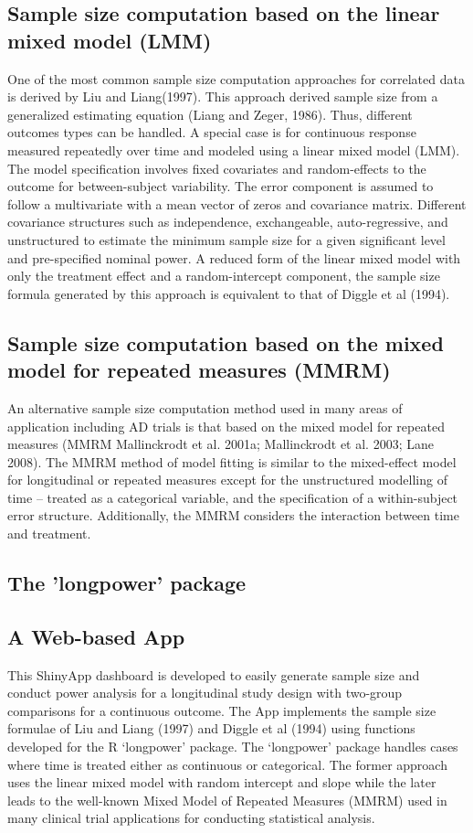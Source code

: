 \documentclass[oupdraft]{bio}
\begin{document}
\subsection{Sample size computation based on the linear mixed model (LMM)}
\label{model}
One of the most common sample size computation approaches for correlated data is derived by Liu and Liang(1997). This approach derived sample size from a generalized estimating equation (Liang and Zeger, 1986). Thus, different outcomes types can be handled. A special case is for continuous response measured repeatedly over time and modeled using a linear mixed model (LMM). The model specification involves fixed covariates and random-effects to the outcome for between-subject variability. The error component is assumed to follow a multivariate with a mean vector of zeros and covariance matrix. Different covariance structures such as independence, exchangeable, auto-regressive, and unstructured to estimate the minimum sample size for a given significant level and pre-specified nominal power. A reduced form of the linear mixed model with only the treatment effect and a random-intercept component, the sample size formula generated by this approach is equivalent to that of Diggle et al (1994). 

\subsection{Sample size computation based on the mixed model for repeated measures (MMRM)}
\label{model2}
An alternative sample size computation method used in many areas of application including AD trials is that based on the mixed model for repeated measures (MMRM Mallinckrodt et al. 2001a; Mallinckrodt et al. 2003; Lane 2008). The MMRM method of model fitting is similar to the mixed-effect model for longitudinal or repeated measures except for the unstructured modelling of time – treated as a categorical variable, and the specification of a within-subject error structure. Additionally, the MMRM considers the interaction between time and treatment. 

\subsection{The 'longpower' package}
\label{model3}

\subsection{A Web-based App}
\label{model4}
This ShinyApp dashboard is developed to easily generate sample size and conduct power analysis for a longitudinal study design with two-group comparisons for a continuous outcome. The App implements the sample size formulae of Liu and Liang (1997) and Diggle et al (1994) using functions developed for the R `longpower' package. The `longpower' package handles cases where time is treated either as continuous or categorical. The former approach uses the linear mixed model with random intercept and slope while the later leads to the well-known Mixed Model of Repeated Measures (MMRM) used in many clinical trial applications for conducting statistical analysis. 
\end{document}
